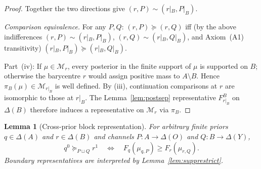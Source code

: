 \documentclass[11pt,a4paper]{article}
\newtheorem{lemma}[theorem]{Lemma}
\theoremstyle{definition}
\newcommand{\1}{\mathbf 1}
\begin{document}
\begin{proof}
Together the two directions give $(r,P)\sim(r|_B,P|_B)$.

\emph{Comparison equivalence.}  For any $P,Q$: $(r,P)\succeq(r,Q)$ iff (by the above indifferences $(r,P)\sim(r|_B,P|_B)$,
$(r,Q)\sim(r|_B,Q|_B)$, and Axiom~\textup{(A1)} transitivity) $(r|_B,P|_B)\succeq(r|_B,Q|_B)$.

Part~(iv): If $\mu\in\mathcal M_r$, every posterior in the finite support of $\mu$ is supported on $B$; otherwise the
barycentre $r$ would assign positive mass to $A\setminus B$.  Hence $\pi_B(\mu)\in\mathcal M_{r|_B}$ is well defined.
By (iii), continuation comparisons at $r$ are isomorphic to those at $r|_B$.  The Lemma~\ref{lem:postsep} representative
$F_{r|_B}^B$ on $\Delta(B)$ therefore induces a representative on $\mathcal M_r$ via $\pi_B$.
\end{proof}

\begin{lemma}[Cross-prior block representation]\label{lem:blockbridge}
For arbitrary finite priors $q\in\Delta(A)$ and $r\in\Delta(B)$ and channels
$P:A\to\Delta(O)$ and $Q:B\to\Delta(Y)$,
\begin{equation}
q^0\succeq_{P\sqcup Q}r^1
\quad\Longleftrightarrow\quad
F_q(\mu_{q,P})\ge F_r(\mu_{r,Q}).
\tag{BC}\label{eq:blockcomp}
\end{equation}
Boundary representatives are interpreted by Lemma~\ref{lem:supprestrict}.
\end{lemma}
\end{document}

